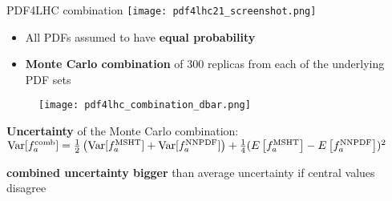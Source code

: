 \begin{frame}[t]{PDF4LHC combination}
  \vspace*{-1cm}
      \hfill \texttt{[image: pdf4lhc21\_screenshot.png]}
      \vspace*{-0.3cm}
      \begin{itemize}
        \item All PDFs assumed to have {\bf equal probability}
        \item {\bf Monte Carlo combination} of 300 replicas from each of the underlying PDF sets
      \end{itemize}


      \begin{figure}
        \centering
        \texttt{[image: pdf4lhc\_combination\_dbar.png]}
      \end{figure}
      {\bf Uncertainty} of the Monte Carlo combination:\\
      $
      {\rm Var}[f_a^{\rm comb}] = \frac{1}{2}\left({\rm Var}[f_a^{\rm MSHT}] +{\rm Var}[f_a^{\rm NNPDF}]  \right)+  \frac{1}{4} (E\left[f_a^{\rm MSHT}\right] - E\left[f_a^{\rm NNPDF}\right])^2
      $

      {\bf combined uncertainty bigger} than average uncertainty if central values disagree
\end{frame}



